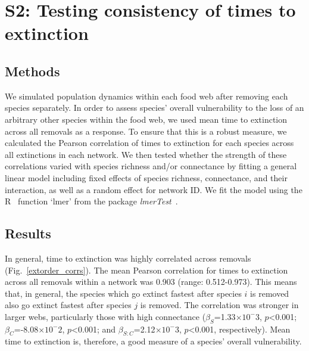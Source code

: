 \documentclass[12pt]{article}
\begin{document}
\clearpage


\section*{S2: Testing consistency of times to extinction}

	\subsection*{Methods}

		We simulated population dynamics within each food web after removing each species separately. 
		In order to assess species' overall vulnerability to the loss of an arbitrary other species within the food web, we used mean time to extinction across all removals as a response. 
		To ensure that this is a robust measure, we calculated the Pearson correlation of times to extinction for each species across all extinctions in each network. 
		We then tested whether the strength of these correlations varied with species richness and/or connectance by fitting a general linear model including fixed effects of species richness, connectance, and their interaction, as well as a random effect for network ID. 
		We fit the model using the R~\citep{R} function `lmer' from the package \emph{lmerTest}~\citep{lmerTest}.


	\subsection*{Results}

		In general, time to extinction was highly correlated across removals (Fig.~\ref{extorder_corrs}). %
		The mean Pearson correlation for times to extinction across all removals within a network was 0.903 (range: 0.512-0.973). %
		This means that, in general, the species which go extinct fastest after species $i$ is removed also go extinct fastest after species $j$ is removed.
		The correlation was stronger in larger webs, particularly those with high connectance ($\beta_{S}$=1.33$\times10^-3$, $p$\textless0.001; $\beta_{C}$=-8.08$\times10^-2$, $p$\textless0.001; and $\beta_{S:C}$=2.12$\times10^-3$, $p$\textless0.001, respectively). 
		Mean time to extinction is, therefore, a good measure of a species' overall vulnerability.
\end{document}
